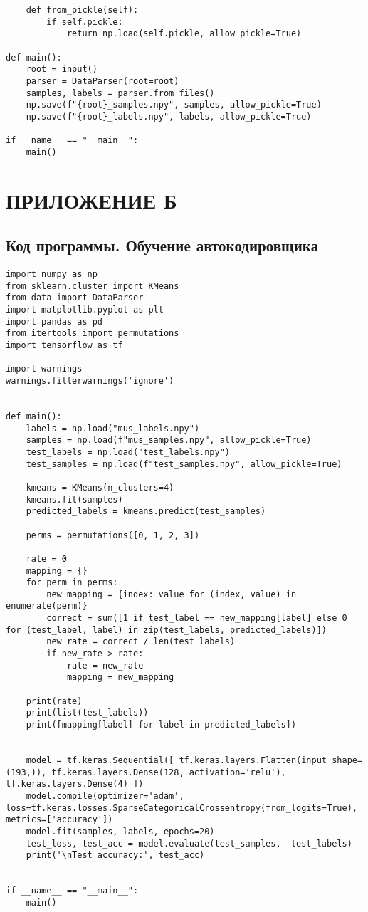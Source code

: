 \begin{footnotesize}
\begin{lstlisting}
    def from_pickle(self):
        if self.pickle:
            return np.load(self.pickle, allow_pickle=True)

def main():
    root = input()
    parser = DataParser(root=root)
    samples, labels = parser.from_files()
    np.save(f"{root}_samples.npy", samples, allow_pickle=True)
    np.save(f"{root}_labels.npy", labels, allow_pickle=True)

if __name__ == "__main__":
    main()

\end{lstlisting}
\end{footnotesize}

\chapter*{ПРИЛОЖЕНИЕ Б}
\section*{\centering Код программы. Обучение автокодировщика}
\begin{footnotesize}
\begin{lstlisting}
import numpy as np
from sklearn.cluster import KMeans
from data import DataParser
import matplotlib.pyplot as plt
import pandas as pd
from itertools import permutations 
import tensorflow as tf

import warnings
warnings.filterwarnings('ignore')


def main():
    labels = np.load("mus_labels.npy")
    samples = np.load(f"mus_samples.npy", allow_pickle=True)
    test_labels = np.load("test_labels.npy")
    test_samples = np.load(f"test_samples.npy", allow_pickle=True)

    kmeans = KMeans(n_clusters=4)
    kmeans.fit(samples)
    predicted_labels = kmeans.predict(test_samples)

    perms = permutations([0, 1, 2, 3]) 

    rate = 0
    mapping = {}
    for perm in perms:
        new_mapping = {index: value for (index, value) in enumerate(perm)}
        correct = sum([1 if test_label == new_mapping[label] else 0 for (test_label, label) in zip(test_labels, predicted_labels)])
        new_rate = correct / len(test_labels)
        if new_rate > rate:
            rate = new_rate
            mapping = new_mapping

    print(rate)
    print(list(test_labels))
    print([mapping[label] for label in predicted_labels])


    model = tf.keras.Sequential([ tf.keras.layers.Flatten(input_shape=(193,)), tf.keras.layers.Dense(128, activation='relu'), tf.keras.layers.Dense(4) ])
    model.compile(optimizer='adam', loss=tf.keras.losses.SparseCategoricalCrossentropy(from_logits=True), metrics=['accuracy'])
    model.fit(samples, labels, epochs=20)
    test_loss, test_acc = model.evaluate(test_samples,  test_labels)
    print('\nTest accuracy:', test_acc)


if __name__ == "__main__":
    main()
\end{lstlisting}
\end{footnotesize}